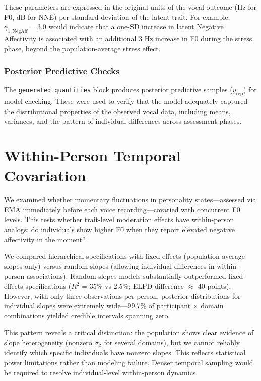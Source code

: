 \documentclass[
  english,
  man,floatsintext]{apa6}
\begin{document}
These parameters are expressed in the original units of the vocal outcome (Hz for F0, dB for NNE) per standard deviation of the latent trait. For example, \(\gamma_{1,\text{NegAff}} = 3.0\) would indicate that a one-SD increase in latent Negative Affectivity is associated with an additional 3 Hz increase in F0 during the stress phase, beyond the population-average stress effect.

\subsubsection{Posterior Predictive Checks}\label{posterior-predictive-checks}

The \texttt{generated\ quantities} block produces posterior predictive samples (\(y_{\text{rep}}\)) for model checking. These were used to verify that the model adequately captured the distributional properties of the observed vocal data, including means, variances, and the pattern of individual differences across assessment phases.

\newpage

\section{Within-Person Temporal Covariation}\label{within-person-temporal-covariation}

We examined whether momentary fluctuations in personality states---assessed via EMA immediately before each voice recording---covaried with concurrent F0 levels. This tests whether trait-level moderation effects have within-person analogs: do individuals show higher F0 when they report elevated negative affectivity in the moment?

We compared hierarchical specifications with fixed effects (population-average slopes only) versus random slopes (allowing individual differences in within-person associations). Random slopes models substantially outperformed fixed-effects specifications (\(R^2\) = 35\% vs 2.5\%; ELPD difference \(\approx\) 40 points). However, with only three observations per person, posterior distributions for individual slopes were extremely wide---99.7\% of participant × domain combinations yielded credible intervals spanning zero.

This pattern reveals a critical distinction: the population shows clear evidence of slope heterogeneity (nonzero \(\sigma_\beta\) for several domains), but we cannot reliably identify which specific individuals have nonzero slopes. This reflects statistical power limitations rather than modeling failure. Denser temporal sampling would be required to resolve individual-level within-person dynamics.
\end{document}
